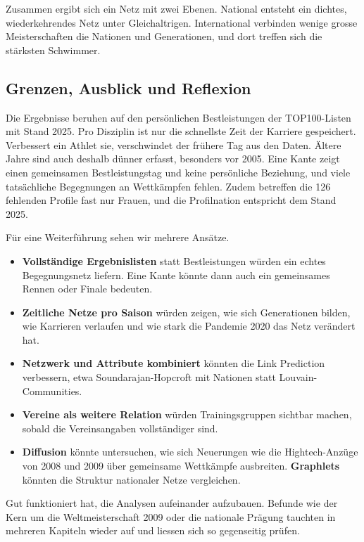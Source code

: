 Zusammen ergibt sich ein Netz mit zwei Ebenen. National entsteht ein dichtes,
wiederkehrendes Netz unter Gleichaltrigen. International verbinden wenige
grosse Meisterschaften die Nationen und Generationen, und dort treffen sich
die stärksten Schwimmer.

\subsection{Grenzen, Ausblick und Reflexion}
Die Ergebnisse beruhen auf den persönlichen Bestleistungen der TOP100-Listen
mit Stand 2025. Pro Disziplin ist nur die schnellste Zeit der Karriere gespeichert. Verbessert ein Athlet sie, verschwindet der frühere Tag aus den Daten. Ältere Jahre sind auch deshalb dünner erfasst, besonders vor 2005. Eine Kante zeigt einen gemeinsamen Bestleistungstag und keine persönliche Beziehung, und viele tatsächliche Begegnungen an Wettkämpfen fehlen. Zudem betreffen die 126 fehlenden Profile fast
nur Frauen, und die Profilnation entspricht dem Stand 2025.

Für eine Weiterführung sehen wir mehrere Ansätze.
\begin{itemize}
  \item \textbf{Vollständige Ergebnislisten} statt Bestleistungen würden ein
  echtes Begegnungsnetz liefern. Eine Kante könnte dann auch ein gemeinsames
  Rennen oder Finale bedeuten.
  \item \textbf{Zeitliche Netze pro Saison} würden zeigen, wie sich
  Generationen bilden, wie Karrieren verlaufen und wie stark die Pandemie
  2020 das Netz verändert hat.
  \item \textbf{Netzwerk und Attribute kombiniert} könnten die Link
  Prediction verbessern, etwa Soundarajan-Hopcroft mit Nationen statt
  Louvain-Communities.
  \item \textbf{Vereine als weitere Relation} würden Trainingsgruppen
  sichtbar machen, sobald die Vereinsangaben vollständiger sind.
  \item \textbf{Diffusion} könnte untersuchen, wie sich Neuerungen wie die
  Hightech-Anzüge von 2008 und 2009 über gemeinsame Wettkämpfe ausbreiten.
  \textbf{Graphlets} könnten die Struktur nationaler Netze vergleichen.
\end{itemize}

Gut funktioniert hat, die Analysen aufeinander aufzubauen. Befunde wie der
Kern um die Weltmeisterschaft 2009 oder die nationale Prägung tauchten in
mehreren Kapiteln wieder auf und liessen sich so gegenseitig prüfen.

